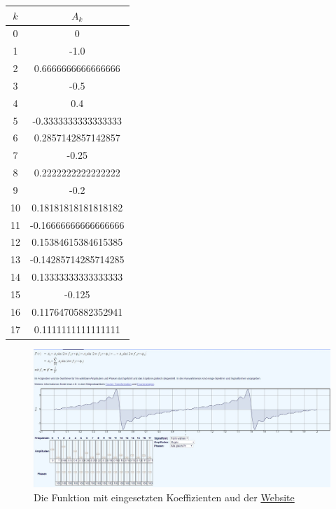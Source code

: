 \begin{table}
  \centering
  \label{tab:koeffizienten}
  \begin{tabular}{c c}
    \toprule
    $k$ & $A_k$\\
    \midrule
    0 &0 \\
    1 &-1.0 \\
    2 &0.6666666666666666\\
    3 &-0.5\\
    4 &0.4\\
    5 &-0.3333333333333333\\
    6 &0.2857142857142857\\
    7 &-0.25\\
    8 &0.2222222222222222\\
    9 &-0.2\\
    10 &0.18181818181818182\\
    11 &-0.16666666666666666\\
    12 &0.15384615384615385\\
    13 &-0.14285714285714285\\
    14 &0.13333333333333333\\
    15 &-0.125\\
    16 &0.11764705882352941\\
    17 & 0.1111111111111111 \\
    \bottomrule
  \end{tabular}
\end{table}
\begin{figure}
  \centering
  \includegraphics[width=\textwidth]{content/Fourier_x.png}
  \caption{Die Funktion mit eingesetzten Koeffizienten aud der \href{https://www.j-berkemeier.de/Fouriersynthese.html}{Website}}
  \label{fig:f(x)=x}
\end{figure}

